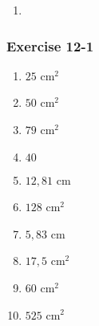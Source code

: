 \begin{enumerate}[noitemsep, label=\textbf{\arabic*}.]
\begin{enumerate}[noitemsep, label=\textbf{(\alph*)} ]
\end{enumerate}


\item %

\end{enumerate}

\subsubsection*{Exercise 12-1} %

\begin{enumerate}[noitemsep, label=\textbf{\arabic*}. ] 
 \item $25$ cm$^2$
\item $50$ cm$^2$
\item $79$ cm$^2$
\item $40$
\item $12,81$ cm
\item $128$ cm$^2$
\item $5,83$ cm
\item $17,5$ cm$^2$
\item $60$ cm$^2$
\item $525$ cm$^2$
\end{enumerate}
